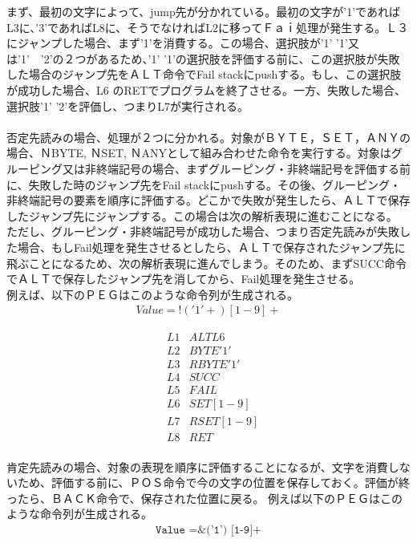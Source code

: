 \documentclass[12pt,oneside]{report}
\begin{document}
まず、最初の文字によって、jump先が分かれている。最初の文字が'1'であればL3に、'3'であればL8に、そうでなければL2に移ってＦａｉ処理が発生する。Ｌ３にジャンプした場合、まず'1'を消費する。この場合、選択肢が'1' '1'又は'1'　'2'の２つがあるため、'1' '1'の選択肢を評価する前に、この選択肢が失敗した場合のジャンプ先をＡＬＴ命令でFail stackにpushする。もし、この選択肢が成功した場合、L6 のRETでプログラムを終了させる。一方、失敗した場合、選択肢'1' '2'を評価し、つまりL7が実行される。\\
\\
否定先読みの場合、処理が２つに分かれる。対象がＢＹＴＥ，ＳＥＴ，ＡＮＹの場合、ＮBYTE, ＮSET, ＮANYとして組み合わせた命令を実行する。対象はグルーピング又は非終端記号の場合、まずグルーピング・非終端記号を評価する前に、失敗した時のジャンプ先をFail stackにpushする。その後、グルーピング・非終端記号の要素を順序に評価する。どこかで失敗が発生したら、ＡＬＴで保存したジャンプ先にジャンプする。この場合は次の解析表現に進むことになる。\\
ただし、グルーピング・非終端記号が成功した場合、つまり否定先読みが失敗した場合、もしFail処理を発生させるとしたら、ＡＬＴで保存されたジャンプ先に飛ぶことになるため、次の解析表現に進んでしまう。そのため、まずSUCC命令でＡＬＴで保存したジャンプ先を消してから、Fail処理を発生させる。\\
例えば、以下のＰＥＧはこのような命令列が生成される。
\begin{eqnarray}\nonumber
Value = !('1'+) [1-9]+\nonumber
\end{eqnarray}

\begin{eqnarray}\nonumber
&L1& ALT L6\\\nonumber
&L2& BYTE '1'\\\nonumber
&L3& RBYTE '1'\\\nonumber
&L4& SUCC\\\nonumber
&L5& FAIL\\\nonumber
&L6& SET [1-9]\\\nonumber
&L7& RSET [1-9]\\\nonumber
&L8& RET\\\nonumber
\end{eqnarray} 

肯定先読みの場合、対象の表現を順序に評価することになるが、文字を消費しないため、評価する前に、ＰＯＳ命令で今の文字の位置を保存しておく。評価が終ったら、ＢＡＣＫ命令で、保存された位置に戻る。
例えば以下のＰＥＧはこのような命令列が生成される。
\begin{eqnarray}\nonumber
\texttt{Value =\&('1') [1-9]+}
\end{eqnarray}
\end{document}

